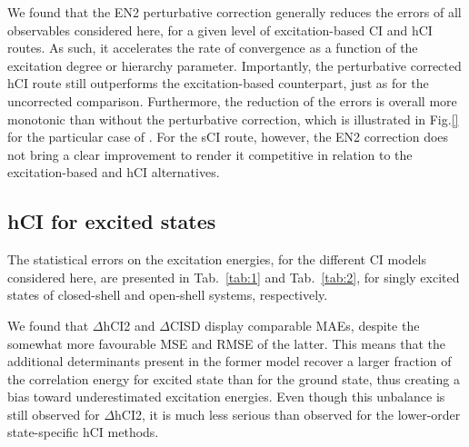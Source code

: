\documentclass[aip,jcp,reprint,noshowkeys,superscriptaddress]{revtex4-1}
\begin{document}
We found that the EN2 perturbative correction generally reduces the errors of all observables considered here, for a given level of excitation-based CI and hCI routes.
As such, it accelerates the rate of convergence as a function of the excitation degree or hierarchy parameter.
Importantly, the perturbative corrected hCI route still outperforms the excitation-based counterpart, just as for the uncorrected comparison.
Furthermore, the reduction of the errors is overall more monotonic than without the perturbative correction,
which is illustrated in Fig.\ref{} for the particular case of .
For the sCI route, however, the EN2 correction does not bring a clear improvement to render it competitive in relation to the excitation-based and hCI alternatives.


 


\subsection{hCI for excited states}
\label{sec:res_B}

The statistical errors on the excitation energies, for the different CI models considered here,
are presented in Tab.~\ref{tab:1} and Tab.~\ref{tab:2},
for singly excited states of closed-shell and open-shell systems, respectively.

We found that $\Delta$hCI2 and $\Delta$CISD display comparable MAEs, despite the somewhat more favourable MSE and RMSE of the latter.
This means that the additional determinants present in the former model recover a larger fraction of the correlation energy for excited state than for the ground state,
thus creating a bias toward underestimated excitation energies.
Even though this unbalance is still observed for $\Delta$hCI2, it is much less serious than observed for the lower-order state-specific hCI methods.

\end{document}
